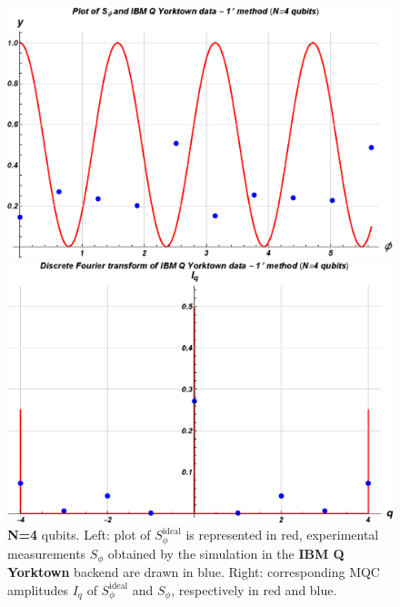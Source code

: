 \begin{figure}[h!]
\begin{minipage}[c]{0.5\linewidth}
\hspace{1cm}
\centering \includegraphics[width=1\textwidth]{./chapter3/graphics_IBM/real_device/S4.eps}
\end{minipage}
\begin{minipage}[]{0.5\linewidth}
\centering \includegraphics[width=1\textwidth]{./chapter3/graphics_IBM/real_device/I4.eps}
\end{minipage}
\caption{\label{RealDeviceIBMQX24} \textbf{N=4} qubits. Left:  plot of $S_{\phi}^{\text{ideal}}$ is represented in red, experimental measurements $S_{\phi}$ obtained by the simulation in the \textbf{IBM Q Yorktown} backend are drawn in blue. Right: corresponding MQC amplitudes $I_q$ of $S_\phi^{\text{ideal}}$ and $S_\phi$, respectively in red and blue.}
\end{figure}

